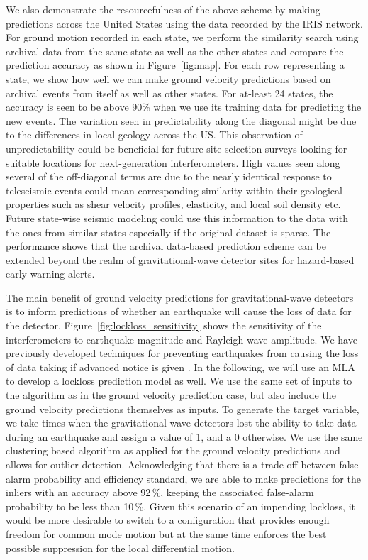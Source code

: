 \documentclass[twocolumn, aps, superscriptaddress]{revtex4}
\begin{document}
We also demonstrate the resourcefulness  of the above scheme by making predictions across the United States using the data recorded by the IRIS network. For ground motion recorded in each state, we perform the similarity search using archival data from the same state as well as the other states and compare the prediction accuracy as shown in Figure~\ref{fig:map}. For each row representing a state, we show how well we can make ground velocity predictions based on archival events from itself as well as other states. For at-least 24 states, the accuracy is seen to be above 90\% when we use its training data for predicting the new events. The variation seen in predictability along the diagonal might be due to the differences in local geology across the US. This observation of unpredictability could be beneficial for future site selection surveys looking for suitable locations for next-generation interferometers. High values seen along several of the off-diagonal terms are due to the nearly identical response to teleseismic events could mean corresponding similarity within their geological properties such as shear velocity profiles, elasticity, and local soil density etc. Future state-wise seismic modeling could use this information to the data with the ones from similar states especially if the original dataset is sparse. The performance shows that the archival data-based prediction scheme can be extended beyond the realm of gravitational-wave detector sites for hazard-based early warning alerts.

The main benefit of ground velocity predictions for gravitational-wave detectors is to inform predictions of whether an earthquake will cause the loss of data for the detector. Figure~\ref{fig:lockloss_sensitivity} shows the sensitivity of the interferometers to earthquake magnitude and Rayleigh wave amplitude.
We have previously developed techniques for preventing earthquakes from causing the loss of data taking if advanced notice is given \cite{BiWa2018}.
In the following, we will use an MLA to develop a lockloss prediction model as well. 
We use the same set of inputs to the algorithm as in the ground velocity prediction case, but also include the ground velocity predictions themselves as inputs.
To generate the target variable, we take times when the gravitational-wave detectors lost the ability to take data during an earthquake and assign a value of 1, and a 0 otherwise. We use the same clustering based algorithm as applied for the ground velocity predictions and allows for outlier detection.
Acknowledging that there is a trade-off between false-alarm probability and efficiency standard, 
we are able to make predictions for the inliers with an accuracy above 92\,\%, keeping the associated false-alarm probability to be less than 10\,\%. Given this scenario of an impending lockloss, it would be more desirable to switch to a configuration that provides enough freedom for common mode motion but at the same time enforces the best possible suppression for the local differential motion.
\end{document}

